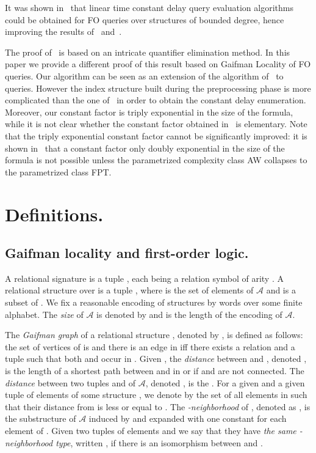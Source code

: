 \documentclass{LMCS}
\newcommand\cA{\ensuremath{{\mathcal A}}\xspace}
\begin{document}
It was shown in~\cite{DurandGrandjean07} that linear time constant delay query
evaluation algorithms could be obtained for FO queries over structures
of bounded degree, hence improving the results of~\cite{Seese96}
and~\cite{FrickGrohe04}.


The proof of~\cite{DurandGrandjean07} is based on an intricate quantifier
elimination method. In this paper we provide a different proof of this result
based on Gaifman Locality of FO queries. Our algorithm can be seen as an extension
of the algorithm of~\cite{FrickGrohe04} to queries. However the index structure
built during the preprocessing phase is more complicated than the one
of~\cite{FrickGrohe04} in order to obtain the constant delay enumeration.
Moreover, our constant factor is triply exponential in the size of the formula,
while it is not clear whether the constant factor obtained
in~\cite{DurandGrandjean07} is elementary. Note that the triply exponential
constant factor cannot be significantly improved: it is shown
in~\cite{FrickGrohe04} that a constant factor only doubly exponential in the
size of the formula is not possible unless the parametrized complexity class
AW collapses to the parametrized class FPT.

\section{Definitions.}
\subsection{Gaifman locality and first-order logic.}

A relational signature is a tuple , each 
being a relation symbol of arity . A relational structure over  is
a tuple , where  is the set of elements of \cA and  is
a subset of .
We fix a reasonable encoding of structures by words over some finite
alphabet. The \emph{size} of \cA is denoted by  and is the length of
the encoding of \cA.

The \emph{Gaifman graph} of a relational structure , denoted by ,
is defined as follows: the set of vertices of  is  and there is an
edge  in  iff there exists a relation  and a tuple  such that both  and  occur in . Given , the
\emph{distance} between  and , denoted , is the length of a
shortest path between  and  in  or  if  and  are
not connected. The \emph{distance} between two tuples  and  of \cA, denoted , is the . For a given  and a given tuple of elements  of some structure , we denote by  the set of all elements in  such
that their distance from  is less or equal to .  The
\emph{-neighborhood} of , denoted as , is the
substructure of \cA induced by  and expanded with one constant
for each element of . 
Given two tuples of elements  and  we say that they have \emph{the same -neighborhood type}, written
, if there is an isomorphism between
 and .
\end{document}
